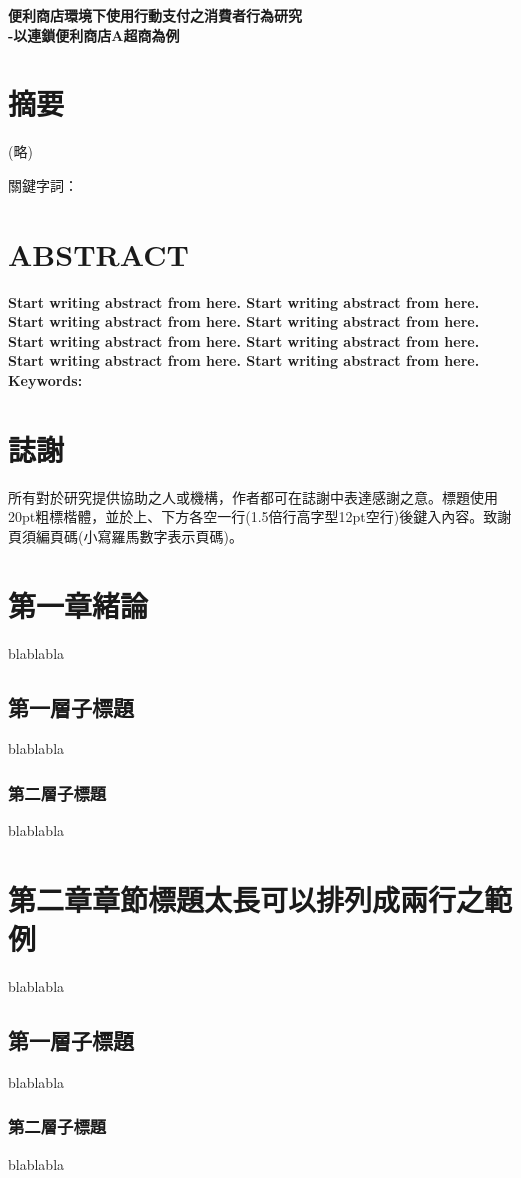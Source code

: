 \documentclass[12pt]{ncut}
\begin{document}
\begin{center} %
    \Large
    \textbf{便利商店環境下使用行動支付之消費者行為研究\\
    -以連鎖便利商店A超商為例}
\end{center}

\section{摘要}
\begin{center}
    (略)
\end{center}
\noindent 關鍵字詞：

\newpage

\section{ABSTRACT}

\textbf{Start writing abstract from here. Start writing abstract from here. Start writing abstract from here. Start writing abstract from here. Start writing abstract from here. Start writing abstract from here. Start writing abstract from here. Start writing abstract from here.\\
Keywords:}

\newpage

\section{誌謝}

\indent
所有對於研究提供協助之人或機構，作者都可在誌謝中表達感謝之意。標題使用 20pt粗標楷體，並於上、下方各空一行(1.5倍行高字型12pt空行)後鍵入內容。致謝頁須編頁碼(小寫羅馬數字表示頁碼)。

\newpage

\tableofcontents
\newpage

\listoftables
\newpage

\listoffigures
\newpage


\setcounter{section}{0} %
\section{第一章緒論}
blablabla

\subsection{第一層子標題}
blablabla

\subsubsection{第二層子標題}
blablabla

\newpage

\section{第二章章節標題太長可以排列成兩行之範例}
blablabla\cite{8643999}
\subsection{第一層子標題}
blablabla
\subsubsection{第二層子標題}
blablabla

\newpage

\newpage
\printbibliography[title={\centering 參考文獻}]
\end{document}
